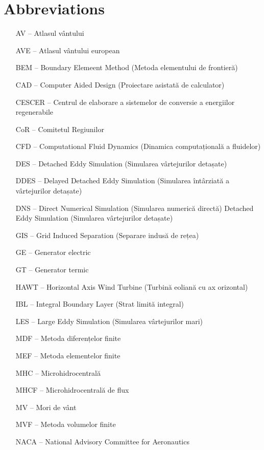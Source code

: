 \section*{Abbreviations}

\begin{itemize}[leftmargin=2cm, topsep=0pt, partopsep=5pt,itemsep=0pt,parsep=0pt]
\item[AV --] Atlasul vântului 
\item[AVE --] Atlasul vântului european 
\item[BEM --] Boundary Elemeent Method (Metoda elementului de frontieră) 
\item[CAD --] Computer Aided Design (Proiectare asistată de calculator)
\item[CESCER --] Centrul de elaborare a sistemelor de conversie a energiilor regenerabile 
\item[CoR --] Comitetul Regiunilor 
\item[CFD --] Computational Fluid Dynamics (Dinamica computațională a fluidelor) 
\item[DES --] Detached Eddy Simulation (Simularea vârtejurilor detașate) 
\item[DDES --] Delayed Detached Eddy Simulation (Simularea întârziată a vârtejurilor detașate) 
\item[DNS --] Direct Numerical Simulation (Simularea numerică directă) Detached Eddy Simulation (Simularea vârtejurilor detașate) 
\item[GIS --] Grid Induced Separation (Separare indusă de rețea) 
\item[GE --] Generator electric 
\item[GT --] Generator termic 
\item[HAWT --] Horizontal Axis Wind Turbine (Turbină eoliană cu ax orizontal) 
\item[IBL --] Integral Boundary Layer (Strat limită integral) 
\item[LES --] Large Eddy Simulation (Simularea vârtejurilor mari) 
\item[MDF --] Metoda diferențelor finite
\item[MEF --] Metoda elementelor finite 
\item[MHC --] Microhidrocentrală 
\item[MHCF --] Microhidrocentrală de flux 
\item[MV --] Mori de vânt 
\item[MVF --] Metoda volumelor finite 
\item[NACA --] National Advisory Committee for Aeronautics  

\end{itemize}
